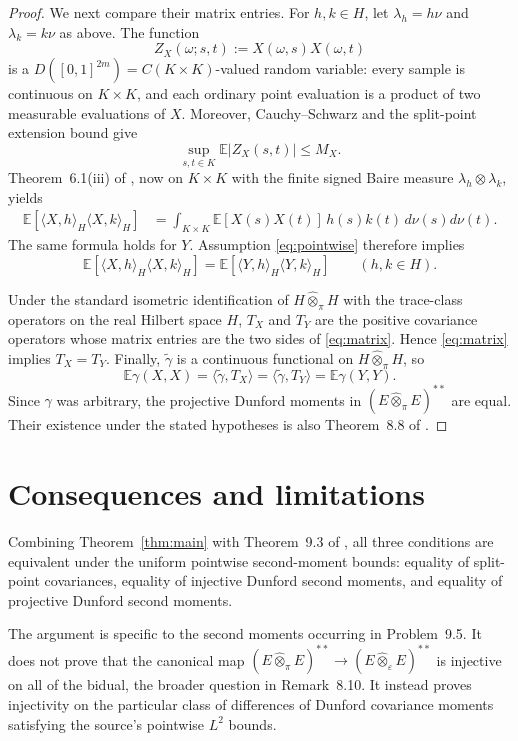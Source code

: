 \documentclass[11pt]{article}
\newcommand{\E}{\mathbb E}
\newcommand{\tp}{\widehat\otimes_\pi}
\begin{document}
\begin{proof}
We next compare their matrix entries.  For $h,k\in H$, let
$\lambda_h=h\nu$ and $\lambda_k=k\nu$ as above.  The function
\[
 Z_X(\omega;s,t):=X(\omega,s)X(\omega,t)
\]
is a $D([0,1]^{2m})=C(K\times K)$-valued random variable: every sample is
continuous on $K\times K$, and each ordinary point evaluation is a product
of two measurable evaluations of $X$.  Moreover, Cauchy--Schwarz and the
split-point extension bound give
\[
 \sup_{s,t\in K}\E|Z_X(s,t)|\le M_X.
\]
Theorem~6.1(iii) of \cite{Janson}, now on $K\times K$ with the finite
signed Baire measure $\lambda_h\otimes\lambda_k$, yields
\begin{align*}
 \E[\langle X,h\rangle_H\langle X,k\rangle_H]
 &=\int_{K\times K}\E[X(s)X(t)]\,h(s)k(t)\,
       d\nu(s)d\nu(t).
\end{align*}
The same formula holds for $Y$.  Assumption \eqref{eq:pointwise} therefore
implies
\begin{equation}\label{eq:matrix}
 \E[\langle X,h\rangle_H\langle X,k\rangle_H]
 =\E[\langle Y,h\rangle_H\langle Y,k\rangle_H]
 \qquad(h,k\in H).
\end{equation}

Under the standard isometric identification of $H\tp H$ with the
trace-class operators on the real Hilbert space $H$, $T_X$ and $T_Y$
are the positive covariance operators whose matrix entries are the two sides
of \eqref{eq:matrix}.  Hence \eqref{eq:matrix} implies $T_X=T_Y$.
Finally, $\widetilde\gamma$ is a continuous functional on $H\tp H$, so
\[
 \E\gamma(X,X)
 =\langle\widetilde\gamma,T_X\rangle
 =\langle\widetilde\gamma,T_Y\rangle
 =\E\gamma(Y,Y).
\]
Since $\gamma$ was arbitrary, the projective Dunford moments in
$(E\tp E)^{**}$ are equal.  Their existence under the stated hypotheses is
also Theorem~8.8 of \cite{Janson}.
\end{proof}

\section{Consequences and limitations}

Combining Theorem~\ref{thm:main} with Theorem~9.3 of \cite{Janson}, all three
conditions are equivalent under the uniform pointwise second-moment bounds:
equality of split-point covariances, equality of injective Dunford second
moments, and equality of projective Dunford second moments.

The argument is specific to the second moments occurring in Problem~9.5.  It
does not prove that the canonical map
$(E\tp E)^{**}\to(E\widehat\otimes_\varepsilon E)^{**}$ is injective on
all of the bidual, the broader question in Remark~8.10.  It instead proves
injectivity on the particular class of differences of Dunford covariance
moments satisfying the source's pointwise $L^2$ bounds.
\end{document}

